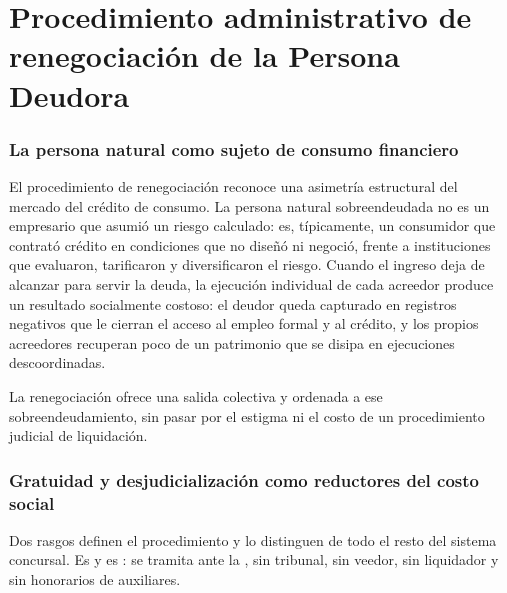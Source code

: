 \chapter{Procedimiento administrativo de renegociación de la Persona Deudora}
\label{cap:renegociacion}


\bloqueTeorico

\subsection{La persona natural como sujeto de consumo financiero}

El procedimiento de renegociación reconoce una asimetría estructural del mercado del
crédito de consumo. La persona natural sobreendeudada no es un empresario que asumió un
riesgo calculado: es, típicamente, un consumidor que contrató crédito en condiciones que
no diseñó ni negoció, frente a instituciones que evaluaron, tarificaron y diversificaron
el riesgo. Cuando el ingreso deja de alcanzar para servir la deuda, la ejecución
individual de cada acreedor produce un resultado socialmente costoso: el deudor queda
capturado en registros negativos que le cierran el acceso al empleo formal y al crédito,
y los propios acreedores recuperan poco de un patrimonio que se disipa en ejecuciones
descoordinadas.

La renegociación ofrece una salida colectiva y ordenada a ese sobreendeudamiento, sin
pasar por el estigma ni el costo de un procedimiento judicial de liquidación.

\subsection{Gratuidad y desjudicialización como reductores del costo social}

Dos rasgos definen el procedimiento y lo distinguen de todo el resto del sistema
concursal. Es  y es : se tramita ante la
\superir{}, sin tribunal, sin veedor, sin liquidador y sin honorarios de auxiliares.

